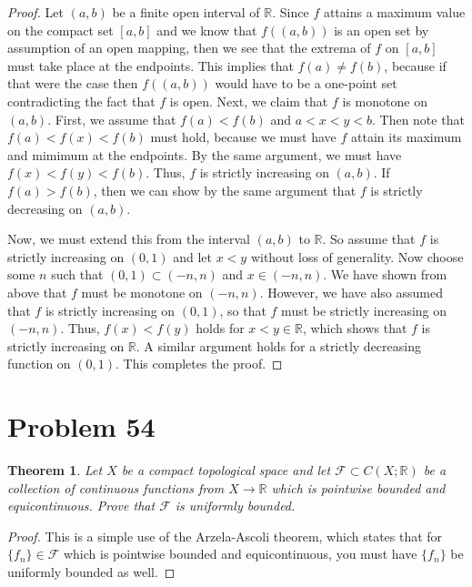 \documentclass[psamsfonts]{amsart}
\newtheorem{thm}{Theorem}[section]
\theoremstyle{definition}
\theoremstyle{remark}
\numberwithin{equation}{section}
\begin{document}
\begin{proof}
Let $(a,b)$ be a finite open interval of $\mathbb{R}$. Since $f$ attains a maximum value on the compact set $[a,b]$ and we know that $f((a,b))$ is an open set by assumption of an open mapping, then we see that the extrema of $f$ on $[a,b]$ must take place at the endpoints. This implies that $f(a) \neq f(b)$, because if that were the case then $f((a,b))$ would have to be a one-point set contradicting the fact that $f$ is open. Next, we claim that $f$ is monotone on $(a,b)$. First, we assume that $f(a) < f(b)$ and $a < x < y< b$. Then note that $f(a) < f(x) < f(b)$ must hold, because we must have $f$ attain its maximum and mimimum at the endpoints. By the same argument, we must have $f(x) < f(y) < f(b)$. Thus, $f$ is strictly increasing on $(a,b)$. If $f(a) > f(b)$, then we can show by the same argument that $f$ is strictly decreasing on $(a,b)$. 

Now, we must extend this from the interval $(a,b)$ to $\mathbb{R}$. So assume that $f$ is strictly increasing on $(0,1)$ and let $x<y$ without loss of generality. Now choose some $n$ such that $(0,1) \subset (-n,n)$ and $x \in (-n,n)$. We have shown from above that $f$ must be monotone on $(-n,n)$. However, we have also assumed that $f$ is strictly increasing on $(0,1)$, so that $f$ must be strictly increasing on $(-n,n)$. Thus, $f(x) < f(y)$ holds for $x<y \in \mathbb{R}$, which shows that $f$ is strictly increasing on $\mathbb{R}$. A similar argument holds for a strictly decreasing function on $(0,1)$. This completes the proof.
\end{proof}

\section{Problem 54}

\begin{thm}
Let $X$ be a compact topological space and let $\mathscr{F} \subset C(X; \mathbb{R})$ be a collection of continuous functions from $X \to \mathbb{R}$ which is pointwise bounded and equicontinuous. Prove that $\mathscr{F}$ is uniformly bounded.
\end{thm}

\begin{proof}
This is a simple use of the Arzela-Ascoli theorem, which states that for $\{f_n \} \in \mathscr{F}$ which is pointwise bounded and equicontinuous, you must have $\{ f_n \}$ be uniformly bounded as well.
\end{proof}
\end{document}
